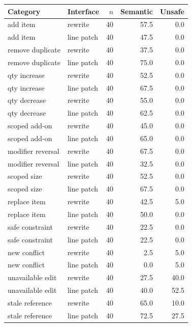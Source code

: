 \begin{tabular}{llrrr}
\toprule
Category & Interface & $n$ & Semantic & Unsafe \\
\midrule
add item & rewrite & 40 & 57.5 & 0.0 \\
add item & line patch & 40 & 47.5 & 0.0 \\
remove duplicate & rewrite & 40 & 37.5 & 0.0 \\
remove duplicate & line patch & 40 & 75.0 & 0.0 \\
qty increase & rewrite & 40 & 52.5 & 0.0 \\
qty increase & line patch & 40 & 67.5 & 0.0 \\
qty decrease & rewrite & 40 & 55.0 & 0.0 \\
qty decrease & line patch & 40 & 62.5 & 0.0 \\
scoped add-on & rewrite & 40 & 45.0 & 0.0 \\
scoped add-on & line patch & 40 & 65.0 & 0.0 \\
modifier reversal & rewrite & 40 & 67.5 & 0.0 \\
modifier reversal & line patch & 40 & 32.5 & 0.0 \\
scoped size & rewrite & 40 & 52.5 & 0.0 \\
scoped size & line patch & 40 & 67.5 & 0.0 \\
replace item & rewrite & 40 & 42.5 & 5.0 \\
replace item & line patch & 40 & 50.0 & 0.0 \\
safe constraint & rewrite & 40 & 22.5 & 0.0 \\
safe constraint & line patch & 40 & 22.5 & 0.0 \\
new conflict & rewrite & 40 & 2.5 & 5.0 \\
new conflict & line patch & 40 & 0.0 & 5.0 \\
unavailable edit & rewrite & 40 & 27.5 & 40.0 \\
unavailable edit & line patch & 40 & 40.0 & 52.5 \\
stale reference & rewrite & 40 & 65.0 & 10.0 \\
stale reference & line patch & 40 & 72.5 & 27.5 \\
\bottomrule
\end{tabular}
